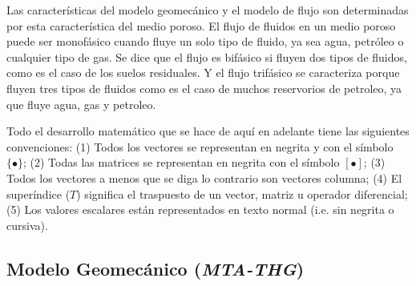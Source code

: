 Las características del modelo geomecánico y el modelo de flujo son determinadas por esta característica del medio poroso. El flujo de fluidos en un medio poroso puede ser monofásico cuando fluye un solo tipo de fluido, ya sea agua, petróleo o cualquier tipo de gas. Se dice que el flujo es bifásico si fluyen dos tipos de fluidos, como es el caso de los suelos residuales. Y el flujo trifásico se caracteriza porque fluyen tres tipos de fluidos como es el caso de muchos reservorios de petroleo, ya que fluye agua, gas y petroleo.\bigskip


\bigskip
Todo el desarrollo matemático que se hace de aquí en adelante tiene las siguientes convenciones: (1) Todos los vectores se representan en negrita y con el símbolo $\mathbf{\{\bullet\}}$; (2) Todas las matrices se representan en negrita con el símbolo $\mathbf{\left[\bullet\right]}$; (3) Todos los vectores a menos que se diga lo contrario son vectores columna; (4) El superíndice ($T$) significa el traspuesto de un vector, matriz u operador diferencial; (5) Los valores escalares están representados en texto normal (i.e. sin negrita o cursiva).\newpage


\subsection{Modelo Geomecánico (\textit{MTA-THG})}~\hypertarget{sec:sec321}{}
\label{sec:sec321}

